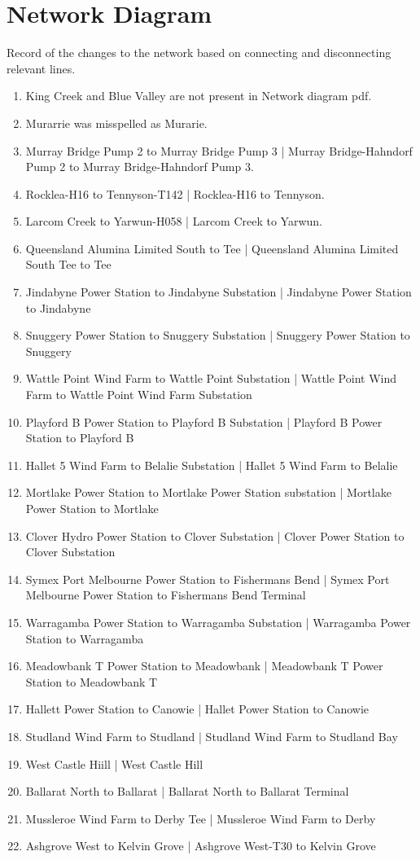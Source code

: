 \documentclass{article}
\begin{document}
\section{Network Diagram}

Record of the changes to the network based on connecting and disconnecting relevant lines.
\begin{enumerate}
\item King Creek and Blue Valley are not present in Network diagram pdf.
\item Murarrie was misspelled as Murarie.
\item Murray Bridge Pump 2 to Murray Bridge Pump 3 | Murray Bridge-Hahndorf Pump 2 to Murray Bridge-Hahndorf Pump 3.
\item Rocklea-H16 to Tennyson-T142 | Rocklea-H16 to Tennyson.
\item Larcom Creek to Yarwun-H058 | Larcom Creek to Yarwun.
\item Queensland Alumina Limited South to Tee | Queensland Alumina Limited South Tee to Tee
\item Jindabyne Power Station to Jindabyne Substation | Jindabyne Power Station to Jindabyne
\item Snuggery Power Station to Snuggery Substation | Snuggery Power Station to Snuggery 
\item Wattle Point Wind Farm to Wattle Point Substation | Wattle Point Wind Farm to Wattle Point Wind Farm Substation
\item Playford B Power Station to Playford B Substation | Playford B Power Station to Playford B
\item Hallet 5 Wind Farm to Belalie Substation | Hallet 5 Wind Farm to Belalie
\item Mortlake Power Station to Mortlake Power Station substation | Mortlake Power Station to Mortlake
\item Clover Hydro Power Station to Clover Substation | Clover Power Station to Clover Substation
\item Symex Port Melbourne Power Station to Fishermans Bend | Symex Port Melbourne Power Station to Fishermans Bend Terminal
\item Warragamba Power Station to Warragamba Substation | Warragamba Power Station to Warragamba
\item Meadowbank T Power Station to Meadowbank | Meadowbank T Power Station to Meadowbank T
\item Hallett Power Station to Canowie | Hallet Power Station to Canowie
\item Studland Wind Farm to Studland | Studland Wind Farm to Studland Bay
\item West Castle Hiill | West Castle Hill
\item Ballarat North to Ballarat | Ballarat North to Ballarat Terminal
\item Mussleroe Wind Farm to Derby Tee | Mussleroe Wind Farm to Derby
\item Ashgrove West to Kelvin Grove | Ashgrove West-T30 to Kelvin Grove
\end{enumerate} 





\end{document}
